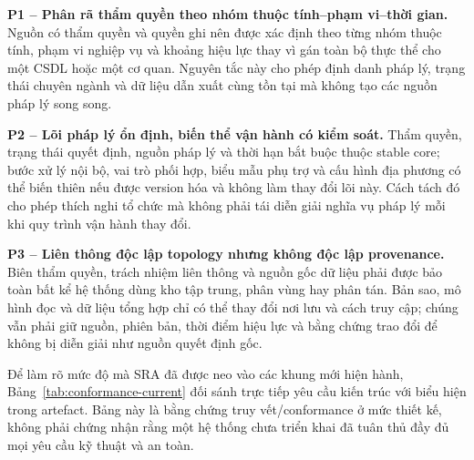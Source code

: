 \textbf{P1 -- Phân rã thẩm quyền theo nhóm thuộc tính--phạm vi--thời gian.} Nguồn có thẩm quyền và quyền ghi nên được xác định theo từng nhóm thuộc tính, phạm vi nghiệp vụ và khoảng hiệu lực thay vì gán toàn bộ thực thể cho một CSDL hoặc một cơ quan. Nguyên tắc này cho phép định danh pháp lý, trạng thái chuyên ngành và dữ liệu dẫn xuất cùng tồn tại mà không tạo các nguồn pháp lý song song.

\textbf{P2 -- Lõi pháp lý ổn định, biến thể vận hành có kiểm soát.} Thẩm quyền, trạng thái quyết định, nguồn pháp lý và thời hạn bắt buộc thuộc stable core; bước xử lý nội bộ, vai trò phối hợp, biểu mẫu phụ trợ và cấu hình địa phương có thể biến thiên nếu được version hóa và không làm thay đổi lõi này. Cách tách đó cho phép thích nghi tổ chức mà không phải tái diễn giải nghĩa vụ pháp lý mỗi khi quy trình vận hành thay đổi.

\textbf{P3 -- Liên thông độc lập topology nhưng không độc lập provenance.} Biên thẩm quyền, trách nhiệm liên thông và nguồn gốc dữ liệu phải được bảo toàn bất kể hệ thống dùng kho tập trung, phân vùng hay phân tán. Bản sao, mô hình đọc và dữ liệu tổng hợp chỉ có thể thay đổi nơi lưu và cách truy cập; chúng vẫn phải giữ nguồn, phiên bản, thời điểm hiệu lực và bằng chứng trao đổi để không bị diễn giải như nguồn quyết định gốc.

Để làm rõ mức độ mà SRA đã được neo vào các khung mới hiện hành, Bảng~\ref{tab:conformance-current} đối sánh trực tiếp yêu cầu kiến trúc với biểu hiện trong artefact. Bảng này là bằng chứng truy vết/conformance ở mức thiết kế, không phải chứng nhận rằng một hệ thống chưa triển khai đã tuân thủ đầy đủ mọi yêu cầu kỹ thuật và an toàn.

